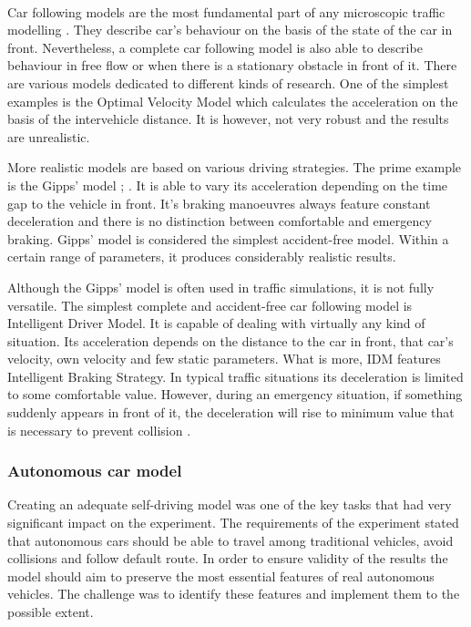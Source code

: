 \documentclass[11pt,english]{article}
\begin{document}
\paragraph{}
Car following models are the most fundamental part of any microscopic traffic modelling \citep{treiber2013traffic}. They describe car's behaviour on the basis of the state of the car in front. Nevertheless, a complete car following model is also able to describe behaviour in free flow or when there is a stationary obstacle in front of it. There are various models dedicated to different kinds of research. One of the simplest examples is the Optimal Velocity Model which calculates the acceleration on the basis of the intervehicle distance. It is however, not very robust and the results are unrealistic. 
\par
More realistic models are based on various driving strategies. The prime example is the Gipps' model \citep{treiber2013traffic}; \citep{rothery1992car}. It is able to vary its acceleration depending on the time gap to the vehicle in front. It's braking manoeuvres always feature constant deceleration and there is no distinction between comfortable and emergency braking. Gipps' model is considered the simplest accident-free model. Within a certain range of parameters, it produces considerably realistic results.
\par
Although the Gipps' model is often used in traffic simulations, it is not fully versatile. The simplest complete and accident-free car following model is Intelligent Driver Model. It is capable of  dealing with virtually any kind of situation. Its acceleration depends on the distance to the car in front, that car's velocity, own velocity and few static parameters. What is more, IDM features Intelligent Braking Strategy. In typical traffic situations its deceleration is limited to some comfortable value. However, during an emergency situation, if something suddenly appears in front of it, the deceleration will rise to minimum value that is necessary to prevent collision \citep{treiber2013traffic}.



\subsubsection{Autonomous car model}


Creating an adequate self-driving model was one of the key tasks that had very significant impact on the experiment. The requirements of the experiment stated that autonomous cars should be able to travel among traditional vehicles, avoid collisions and follow default route. In order to ensure validity of the results the model should aim to preserve the most essential features of real autonomous vehicles. The challenge was to identify these features and implement them to the possible extent. 
\end{document}
